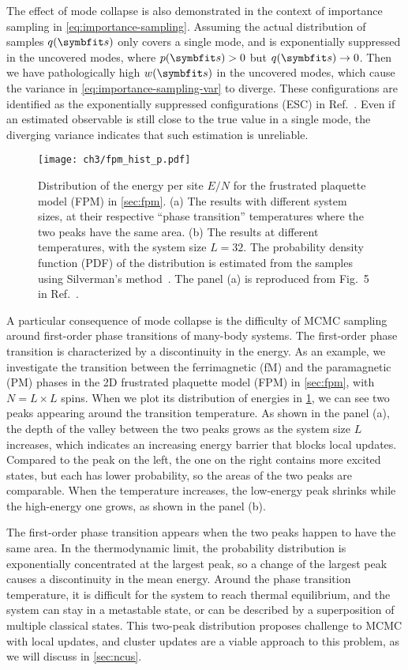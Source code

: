 The effect of mode collapse is also demonstrated in the context of importance sampling in \cref{eq:importance-sampling}. Assuming the actual distribution of samples $q(\vs)$ only covers a single mode, and is exponentially suppressed in the uncovered modes, where $p(\vs) > 0$ but $q(\vs) \to 0$. Then we have pathologically high $w(\vs)$ in the uncovered modes, which cause the variance in \cref{eq:importance-sampling-var} to diverge. These configurations are identified as the exponentially suppressed configurations (ESC) in Ref.~\cite{wu2021unbiased}. Even if an estimated observable is still close to the true value in a single mode, the diverging variance indicates that such estimation is unreliable.

\begin{figure}[htb]
\centering
\texttt{[image: ch3/fpm\_hist\_p.pdf]}
\caption[Distribution of energy for FPM with different sizes and temperatures]{
Distribution of the energy per site $E / N$ for the frustrated plaquette model (FPM) in \cref{sec:fpm}.
(a) The results with different system sizes, at their respective ``phase transition'' temperatures where the two peaks have the same area.
(b) The results at different temperatures, with the system size $L = 32$.
The probability density function (PDF) of the distribution is estimated from the samples using Silverman’s method~\cite{silverman1986density}.
The panel (a) is reproduced from Fig.~5 in Ref.~\cite{wu2021unbiased}.
}
\label{fig:fpm-hist-p}
\end{figure}

A particular consequence of mode collapse is the difficulty of MCMC sampling around first-order phase transitions of many-body systems. The first-order phase transition is characterized by a discontinuity in the energy. As an example, we investigate the transition between the ferrimagnetic (fM) and the paramagnetic (PM) phases in the 2D frustrated plaquette model (FPM) in \cref{sec:fpm}, with $N = L \times L$ spins. When we plot its distribution of energies in \cref{fig:fpm-hist-p}, we can see two peaks appearing around the transition temperature. As shown in the panel (a), the depth of the valley between the two peaks grows as the system size $L$ increases, which indicates an increasing energy barrier that blocks local updates. Compared to the peak on the left, the one on the right contains more excited states, but each has lower probability, so the areas of the two peaks are comparable. When the temperature increases, the low-energy peak shrinks while the high-energy one grows, as shown in the panel (b).

The first-order phase transition appears when the two peaks happen to have the same area. In the thermodynamic limit, the probability distribution is exponentially concentrated at the largest peak, so a change of the largest peak causes a discontinuity in the mean energy. Around the phase transition temperature, it is difficult for the system to reach thermal equilibrium, and the system can stay in a metastable state, or can be described by a superposition of multiple classical states. This two-peak distribution proposes challenge to MCMC with local updates, and cluster updates are a viable approach to this problem, as we will discuss in \cref{sec:ncus}.
